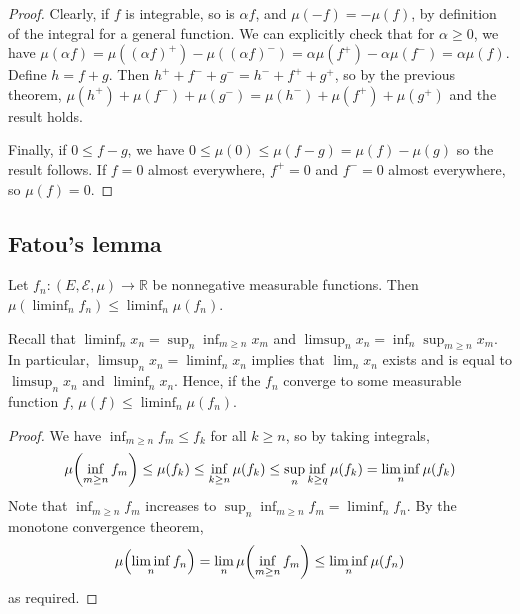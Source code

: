 \begin{proof}
	Clearly, if \( f \) is integrable, so is \( \alpha f \), and \( \mu(-f) = -\mu(f) \), by definition of the integral for a general function.
	We can explicitly check that for \( \alpha \geq 0 \), we have \( \mu(\alpha f) = \mu((\alpha f)^+) - \mu((\alpha f)^-) = \alpha \mu(f^+) - \alpha \mu(f^-) = \alpha \mu(f) \).
	Define \( h = f + g \).
	Then \( h^+ + f^- + g^- = h^- + f^+ + g^+ \), so by the previous theorem, \( \mu(h^+) + \mu(f^-) + \mu(g^-) = \mu(h^-) + \mu(f^+) + \mu(g^+) \) and the result holds.

	Finally, if \( 0 \leq f - g \), we have \( 0 \leq \mu(0) \leq \mu(f - g) = \mu(f) - \mu(g) \) so the result follows.
	If \( f = 0 \) almost everywhere, \( f^+ = 0 \) and \( f^- = 0 \) almost everywhere, so \( \mu(f) = 0 \).
\end{proof}

\subsection{Fatou's lemma}
\begin{lemma}
	Let \( f_n \colon (E, \mathcal E, \mu) \to \mathbb R \) be nonnegative measurable functions.
	Then \( \mu (\liminf_n f_n) \leq \liminf_n \mu(f_n) \).
\end{lemma}
\begin{remark}
	Recall that \( \liminf_n x_n = \sup_n \inf_{m \geq n} x_m \) and \( \limsup_n x_n = \inf_n \sup_{m \geq n} x_m \).
	In particular, \( \limsup_n x_n = \liminf_n x_n \) implies that \( \lim_n x_n \) exists and is equal to \( \limsup_n x_n \) and \( \liminf_n x_n \).
	Hence, if the \( f_n \) converge to some measurable function \( f \), \( \mu(f) \leq \liminf_n \mu(f_n) \).
\end{remark}
\begin{proof}
	We have \( \inf_{m \geq n} f_m \leq f_k \) for all \( k \geq n \), so by taking integrals,
	\[ \mu\qty(\inf_{m \geq n} f_m) \leq \mu(f_k) \leq \inf_{k \geq n} \mu(f_k) \leq \sup_n \inf_{k \geq q} \mu(f_k) = \liminf_n \mu(f_k) \]
	Note that \( \inf_{m \geq n} f_m \) increases to \( \sup_n \inf_{m \geq n} f_m = \liminf_n f_n \).
	By the monotone convergence theorem,
	\[ \mu\qty(\liminf_n f_n) = \lim_n \mu\qty(\inf_{m \geq n} f_m) \leq \liminf_n \mu(f_n) \]
	as required.
\end{proof}


